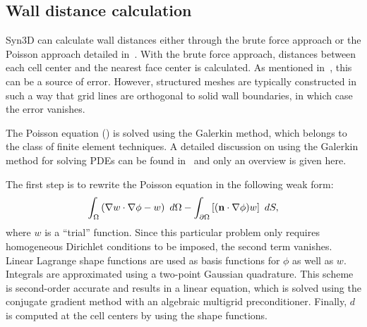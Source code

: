 \subsection{Wall distance calculation}
\label{sec:synwalldist}
Syn3D can calculate wall distances either through the brute force approach or the Poisson approach detailed in~. With the brute force approach, distances between each cell center and the nearest face center is calculated. As mentioned in~, this can be a source of error. However, structured meshes are typically constructed in such a way that grid lines are orthogonal to solid wall boundaries, in which case the error vanishes.

The Poisson equation () is solved using the Galerkin method, which belongs to the class of finite element techniques. A detailed discussion on using the Galerkin method for solving PDEs can be found in~\cite{reddy2006introduction} and only an overview is given here.

The first step is to rewrite the Poisson equation in the following weak form:
\begin{equation*}
    \int_\Omega \left(
        \nabla w\cdot\nabla\phi - w
    \right)~d\Omega
    - \int_{\partial \Omega} \left[
        (\mathbf{n}\cdot\nabla\phi)w
    \right]~dS,
\end{equation*}
where $w$ is a ``trial'' function. Since this particular problem only requires homogeneous Dirichlet conditions to be imposed, the second term vanishes. Linear Lagrange shape functions are used as basis functions for $\phi$ as well as $w$. Integrals are approximated using a two-point Gaussian quadrature. This scheme is second-order accurate and results in a linear equation, which is solved using the conjugate gradient method with an algebraic multigrid preconditioner. Finally, $d$ is computed at the cell centers by using the shape functions.
